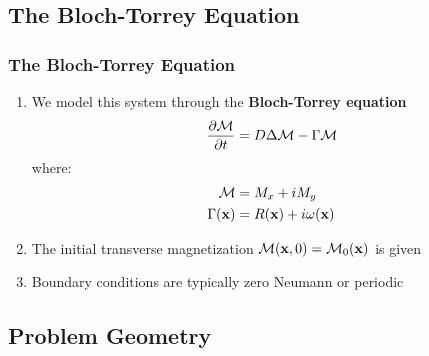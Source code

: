 \subsection{The Bloch-Torrey Equation}

\begin{frame}
\frametitle{The Bloch-Torrey Equation}
\begin{enumerate}
    \item We model this system through the \textbf{Bloch-Torrey equation}
    $$ \frac{\partial \mathcal{M}}{\partial t} = D \mbox{$\Delta$}{\mathcal{M}} - \Gamma \mathcal{M} $$
    where:
    \begin{align*}
        \mathcal{M} &= M_x + i M_y \\
        \Gamma(\mathbf{x}) &= R(\mathbf{x}) + i\omega(\mathbf{x})
    \end{align*}
    \item The initial transverse magnetization $\mathcal{M}(\mathbf{x},0) = \mathcal{M}_0(\mathbf{x})$ is given
    \item Boundary conditions are typically zero Neumann or periodic
\end{enumerate}
\end{frame}

\subsection{Problem Geometry}

